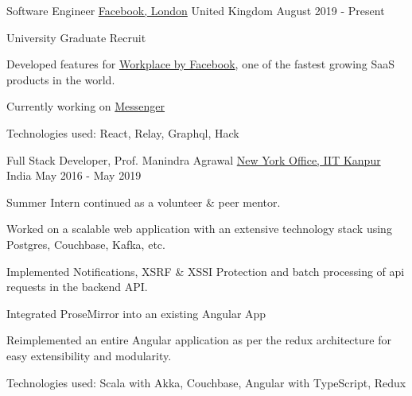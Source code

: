 \begin{cventries}

  \cventry
  {Software Engineer}
  {\href{https://www.facebook.com}{Facebook, London}}
  {United Kingdom}
  {August 2019 - Present}
  {
    \begin{cvitems}
    \item University Graduate Recruit
    \item Developed features for \href{https://www.workplace.com}{Workplace by
        Facebook}, one of the fastest growing SaaS products in the world.
    \item Currently working on \href{https://www.messenger.com}{Messenger}
      \ifdefined \ONEPAGE \else
    \item Technologies used: React, Relay, Graphql, Hack
      \fi
    \end{cvitems}
  }

  \cventry
  {Full Stack Developer, Prof. Manindra Agrawal}
  {\href{https://yashsriv.org/2016/10/thoughts.html}{New York Office, IIT Kanpur}}
  {India}
  {May 2016 - May 2019}
  {
    \begin{cvitems}
      \item Summer Intern continued as a volunteer \& peer mentor.
      \item Worked on a scalable web application with an extensive technology
        stack using Postgres, Couchbase, Kafka, etc.
      \item	Implemented Notifications, XSRF \& XSSI Protection and batch
        processing of api requests in the backend API.
      \item Integrated ProseMirror into an existing Angular App
      \item Reimplemented an entire Angular application as per the redux
        architecture for easy extensibility and modularity.
        \ifdefined \ONEPAGE \else
      \item Technologies used: Scala with Akka, Couchbase, Angular with TypeScript, Redux
        \fi
    \end{cvitems}
  }


\end{cventries}
